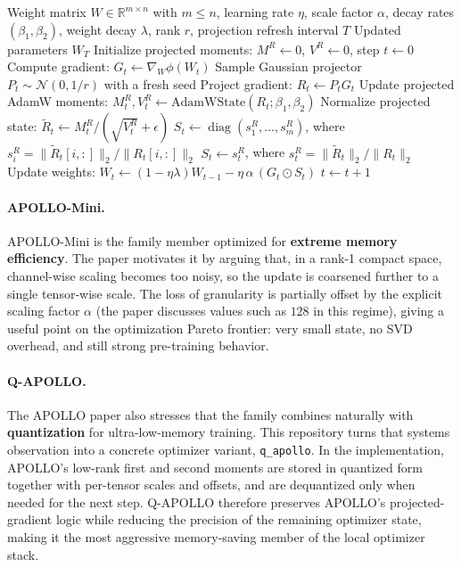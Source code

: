 \documentclass[11pt,a4paper]{article}
\begin{document}
\begin{algorithm}[H]
\caption{APOLLO / APOLLO-Mini Structured Gradient Scaling}
\label{alg:apollo-family}
\begin{algorithmic}[1]
\Require Weight matrix $W \in \mathbb{R}^{m \times n}$ with $m \le n$, learning rate $\eta$, scale factor $\alpha$, decay rates $(\beta_1, \beta_2)$, weight decay $\lambda$, rank $r$, projection refresh interval $T$
\Ensure Updated parameters $W_T$
\State Initialize projected moments: $M^R \gets 0$, $V^R \gets 0$, step $t \gets 0$
\Repeat
    \State Compute gradient: $G_t \gets \nabla_W \phi(W_t)$
        \State Sample Gaussian projector $P_t \sim \mathcal{N}(0, 1/r)$ with a fresh seed
    \EndIf
    \State Project gradient: $R_t \gets P_t G_t$ 
    \State Update projected AdamW moments: $M_t^R, V_t^R \gets \text{AdamWState}(R_t; \beta_1, \beta_2)$
    \State Normalize projected state: $\widetilde{R}_t \gets M_t^R / (\sqrt{V_t^R}+\epsilon)$
        \State $S_t \gets \operatorname{diag}(s_1^R, \ldots, s_m^R)$, where $s_i^R = \|\widetilde{R}_t[i,:]\|_2 / \|R_t[i,:]\|_2$
    \Else
        \State $S_t \gets s_t^R$, where $s_t^R = \|\widetilde{R}_t\|_2 / \|R_t\|_2$
    \EndIf
    \State Update weights: $W_t \gets (1-\eta\lambda)W_{t-1} - \eta\,\alpha\,(G_t \odot S_t)$
    \State $t \gets t+1$
\end{algorithmic}
\end{algorithm}

\paragraph{APOLLO-Mini.}
APOLLO-Mini is the family member optimized for \textbf{extreme memory efficiency}. The paper motivates it by arguing that, in a rank-1 compact space, channel-wise scaling becomes too noisy, so the update is coarsened further to a single tensor-wise scale. The loss of granularity is partially offset by the explicit scaling factor $\alpha$ (the paper discusses values such as $128$ in this regime), giving a useful point on the optimization Pareto frontier: very small state, no SVD overhead, and still strong pre-training behavior.

\paragraph{Q-APOLLO.}
The APOLLO paper also stresses that the family combines naturally with \textbf{quantization} for ultra-low-memory training. This repository turns that systems observation into a concrete optimizer variant, \texttt{q\_apollo}. In the implementation, APOLLO's low-rank first and second moments are stored in quantized form together with per-tensor scales and offsets, and are dequantized only when needed for the next step. Q-APOLLO therefore preserves APOLLO's projected-gradient logic while reducing the precision of the remaining optimizer state, making it the most aggressive memory-saving member of the local optimizer stack.
\end{document}
